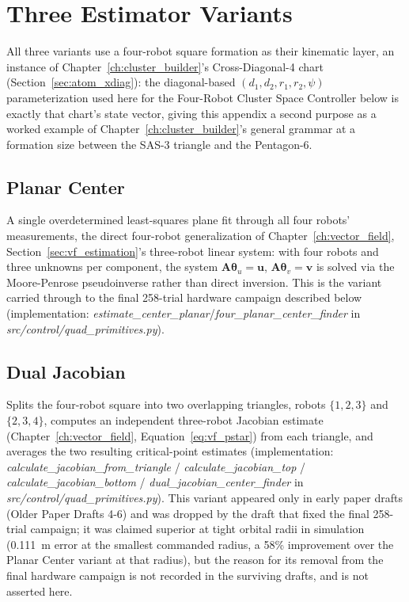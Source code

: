 \documentclass[12pt, letterpaper, oneside]{report}
\begin{document}
\section{Three Estimator Variants}

All three variants use a four-robot square formation as their kinematic
layer, an instance of Chapter~\ref{ch:cluster_builder}'s Cross-Diagonal-4
chart (Section~\ref{sec:atom_xdiag}): the diagonal-based
$(d_1,d_2,r_1,r_2,\psi)$ parameterization used here for the Four-Robot
Cluster Space Controller below is exactly that chart's state vector,
giving this appendix a second purpose as a worked example of
Chapter~\ref{ch:cluster_builder}'s general grammar at a formation size
between the SAS-3 triangle and the Pentagon-6.

\subsection{Planar Center}

A single overdetermined least-squares plane fit through all four
robots' measurements, the direct four-robot generalization of
Chapter~\ref{ch:vector_field}, Section~\ref{sec:vf_estimation}'s
three-robot linear system: with four robots and three unknowns per
component, the system $\mathbf{A}\boldsymbol{\theta}_u=\mathbf{u}$,
$\mathbf{A}\boldsymbol{\theta}_v=\mathbf{v}$ is solved via the
Moore-Penrose pseudoinverse rather than direct inversion. This is the
variant carried through to the final 258-trial hardware campaign
described below (implementation:
\textit{estimate\_center\_planar}/\textit{four\_planar\_center\_finder}
in \textit{src/control/quad\_primitives.py}).

\subsection{Dual Jacobian}

Splits the four-robot square into two overlapping triangles, robots
$\{1,2,3\}$ and $\{2,3,4\}$, computes an independent three-robot
Jacobian estimate (Chapter~\ref{ch:vector_field},
Equation~\eqref{eq:vf_pstar}) from each triangle, and averages the two
resulting critical-point estimates (implementation:
\textit{calculate\_jacobian\_from\_triangle} /
\textit{calculate\_jacobian\_top} / \textit{calculate\_jacobian\_bottom} /
\textit{dual\_jacobian\_center\_finder} in
\textit{src/control/quad\_primitives.py}). This variant appeared only
in early paper drafts (Older Paper Drafts 4-6) and was dropped by the
draft that fixed the final 258-trial campaign; it was claimed superior
at tight orbital radii in simulation (0.111~m error at the smallest
commanded radius, a 58\% improvement over the Planar Center variant at
that radius), but the reason for its removal from the final hardware
campaign is not recorded in the surviving drafts, and is not asserted
here.
\end{document}
